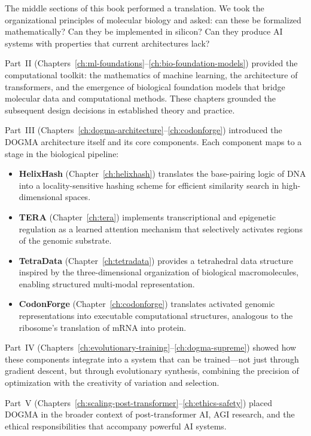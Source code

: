 The middle sections of this book performed a translation. We took the organizational principles of molecular biology and asked: can these be formalized mathematically? Can they be implemented in silicon? Can they produce AI systems with properties that current architectures lack?

Part~II (Chapters~\ref{ch:ml-foundations}--\ref{ch:bio-foundation-models}) provided the computational toolkit: the mathematics of machine learning, the architecture of transformers, and the emergence of biological foundation models that bridge molecular data and computational methods. These chapters grounded the subsequent design decisions in established theory and practice.

Part~III (Chapters~\ref{ch:dogma-architecture}--\ref{ch:codonforge}) introduced the DOGMA architecture itself and its core components. Each component maps to a stage in the biological pipeline:

\begin{itemize}[leftmargin=1.8em]
  \item \textbf{HelixHash} (Chapter~\ref{ch:helixhash}) translates the base-pairing logic of DNA into a locality-sensitive hashing scheme for efficient similarity search in high-dimensional spaces.
  \item \textbf{TERA} (Chapter~\ref{ch:tera}) implements transcriptional and epigenetic regulation as a learned attention mechanism that selectively activates regions of the genomic substrate.
  \item \textbf{TetraData} (Chapter~\ref{ch:tetradata}) provides a tetrahedral data structure inspired by the three-dimensional organization of biological macromolecules, enabling structured multi-modal representation.
  \item \textbf{CodonForge} (Chapter~\ref{ch:codonforge}) translates activated genomic representations into executable computational structures, analogous to the ribosome's translation of mRNA into protein.
\end{itemize}

Part~IV (Chapters~\ref{ch:evolutionary-training}--\ref{ch:dogma-supreme}) showed how these components integrate into a system that can be trained---not just through gradient descent, but through evolutionary synthesis, combining the precision of optimization with the creativity of variation and selection.

Part~V (Chapters~\ref{ch:scaling-post-transformer}--\ref{ch:ethics-safety}) placed DOGMA in the broader context of post-transformer AI, AGI research, and the ethical responsibilities that accompany powerful AI systems.

